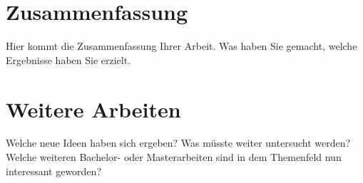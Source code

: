 \section{Zusammenfassung}
Hier kommt die Zusammenfassung Ihrer Arbeit. 
Was haben Sie gemacht, welche Ergebnisse haben Sie erzielt. 

\section{Weitere Arbeiten}
Welche neue Ideen haben sich ergeben? 
Was müsste weiter untersucht werden? 
Welche weiteren Bachelor- oder Masterarbeiten sind in dem Themenfeld nun interessant geworden? 